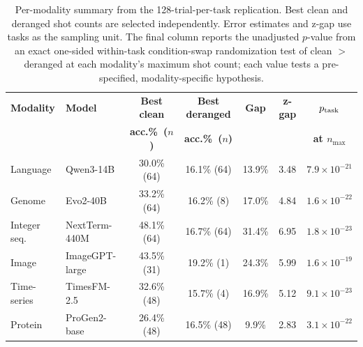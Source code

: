 \begin{table}[!htbp]
    \centering
    \small
    \setlength{\tabcolsep}{5pt}
    \renewcommand{\arraystretch}{1.03}
    \begin{tabular}{@{}llccccc@{}}
        \toprule
        \textbf{Modality} & \textbf{Model} & \textcolor[HTML]{2563EB}{\textbf{Best clean}} & \textcolor[HTML]{DC2626}{\textbf{Best deranged}} & \textbf{Gap} & \textbf{z-gap} & \textbf{$p_{\rm task}$} \\
        & & \textbf{acc.\%\ ($n$)} & \textbf{acc.\%\ ($n$)} & & & \textbf{at $n_{\max}$} \\
        \midrule
        Language & Qwen3-14B & 30.0\% (64) & 16.1\% (64) & 13.9\% & 3.48 & $7.9\times10^{-21}$ \\
        Genome & Evo2-40B & 33.2\% (64) & 16.2\% (8) & 17.0\% & 4.84 & $1.6\times10^{-22}$ \\
        Integer seq. & NextTerm-440M & 48.1\% (64) & 16.7\% (64) & 31.4\% & 6.95 & $1.8\times10^{-23}$ \\
        Image & ImageGPT-large & 43.5\% (31) & 19.2\% (1) & 24.3\% & 5.99 & $1.6\times10^{-19}$ \\
        Time-series & TimesFM-2.5 & 32.6\% (48) & 15.7\% (4) & 16.9\% & 5.12 & $9.1\times10^{-23}$ \\
        Protein & ProGen2-base & 26.4\% (48) & 16.5\% (48) & 9.9\% & 2.83 & $3.1\times10^{-22}$ \\
        \bottomrule
    \end{tabular}
    \caption{Per-modality summary from the 128-trial-per-task replication. Best clean and deranged shot counts are selected independently. Error estimates and z-gap use tasks as the sampling unit. The final column reports the unadjusted $p$-value from an exact one-sided within-task condition-swap randomization test of clean $>$ deranged at each modality's maximum shot count; each value tests a pre-specified, modality-specific hypothesis.}
    \label{tab:modality-summary-128}
\end{table}
